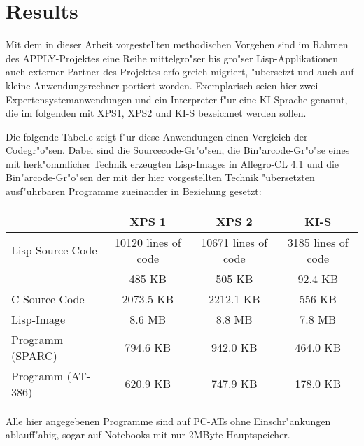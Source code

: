 \section{Results}

Mit dem in dieser Arbeit vorgestellten methodischen Vorgehen sind im
Rahmen des APPLY-Projektes eine Reihe mittelgro"ser bis gro"ser
Lisp-Applikationen auch externer Partner des Projektes erfolgreich
migriert, "ubersetzt und auch auf kleine Anwendungsrechner portiert
worden. Exemplarisch seien hier zwei Expertensystemanwendungen und ein
Interpreter f"ur eine KI-Sprache genannt, die im folgenden mit XPS1,
XPS2 und KI-S bezeichnet werden sollen.

Die folgende Tabelle zeigt f"ur diese Anwendungen einen Vergleich der
Codegr"o"sen. Dabei sind die Sourcecode-Gr"o"sen, die
Bin"arcode-Gr"o"se eines mit herk"ommlicher Technik erzeugten
Lisp-Images in Allegro-CL 4.1 und die Bin"arcode-Gr"o"sen der mit der
hier vorgestellten Technik "ubersetzten ausf"uhrbaren Programme
zueinander in Beziehung gesetzt:

\begin{center}
\begin{tabular}{|l||c|c|c|}\hline
& XPS 1 & XPS 2 & KI-S \\ \hline\hline
Lisp-Source-Code & 10120 lines of code & 10671 lines of code & 3185 lines of code \\
                 & 485 KB & 505 KB & 92.4 KB \\ \hline
C-Source-Code & 2073.5 KB & 2212.1 KB & 556 KB \\ \hline\hline
Lisp-Image & 8.6 MB & 8.8 MB & 7.8 MB \\ \hline\hline
Programm (SPARC) & 794.6 KB & 942.0 KB & 464.0 KB \\ \hline
Programm (AT-386) & 620.9 KB & 747.9 KB & 178.0 KB \\ \hline
\end{tabular}
\end{center}

Alle hier angegebenen Programme sind auf PC-ATs ohne Einschr"ankungen
ablauf\/f"ahig, sogar auf Notebooks mit nur 2MByte Hauptspeicher.

